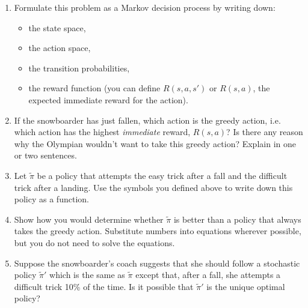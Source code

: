 \documentclass{article}
\theoremstyle{definition}
\begin{document}
\begin{enumerate}[label=\alph*)]
    \item Formulate this problem as a Markov decision process by writing down:
    \begin{itemize}[noitemsep]
        \item the state space,
        \item the action space,
        \item the transition probabilities,
        \item the reward function (you can define $R(s,a,s')$ or $R(s, a)$, the expected immediate reward for the action).
    \end{itemize}

    \item If the snowboarder has just fallen, which action is the greedy action, i.e. which action has the highest \emph{immediate} reward, $R(s, a)$? Is there any reason why the Olympian wouldn't want to take this greedy action? Explain in one or two sentences.

    \item Let $\tilde{\pi}$ be a policy that attempts the easy trick after a fall and the difficult trick after a landing. Use the symbols you defined above to write down this policy as a function.

    \item Show how you would determine whether $\tilde{\pi}$ is better than a policy that always takes the greedy action. Substitute numbers into equations wherever possible, but you do not need to solve the equations.

    \item Suppose the snowboarder's coach suggests that she should follow a stochastic policy $\tilde{\pi}'$ which is the same as $\tilde{\pi}$ except that, after a fall, she attempts a difficult trick 10\% of the time. Is it possible that $\tilde{\pi}'$ is the unique optimal policy?
\end{enumerate}

\clearpage
\end{document}
